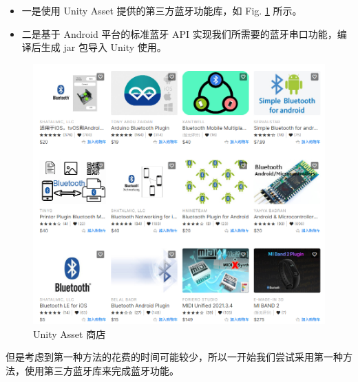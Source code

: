 \documentclass[a4paper,10pt]{article}
\begin{document}
		\begin{itemize}
			\item[(1)] 一是使用 Unity Asset 提供的第三方蓝牙功能库，如 Fig. \ref{fig:unity-asset} 所示。
			\item[(2)] 二是基于 Android 平台的标准蓝牙 API 实现我们所需要的蓝牙串口功能，编译后生成 jar 包导入 Unity 使用。
		\end{itemize}

		\begin{figure}[htbp]
			\centering
			\includegraphics[width=0.5\linewidth]{picture/Unity Asset}
			\caption{Unity Asset 商店}
			\label{fig:unity-asset}
		\end{figure}
		
		但是考虑到第一种方法的花费的时间可能较少，所以一开始我们尝试采用第一种方法，使用第三方蓝牙库来完成蓝牙功能。		
		
		
		
		
			
			
			
			
			
			
		
%		
%		
		
		
	
\end{document}
